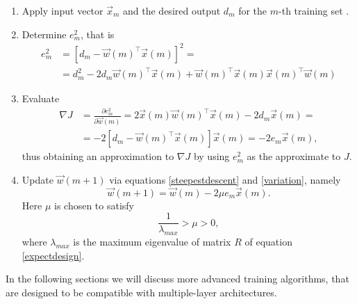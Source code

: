 \documentclass[%
    corpo=11pt,
    twoside,
    stile=classica,
    oldstyle,
    autoretitolo,
    tipotesi=magistrale,
    greek,
    evenboxes,
    english
]{toptesi}
\begin{document}
\begin{enumerate}
\item Apply input vector $\vec{x}_m$ and the desired output $d_m$ for the $m$-th training set .
\item Determine $e_m^2$, that is
\begin{align}
e_m^2  &= \left[d_m - \vec{w}(m)^{\intercal}\vec{x}(m) \right]^2 =  \\ 
& = d_m^2 -2d_m\vec{w}(m)^{\intercal}\vec{x}(m) + \vec{w}(m)^{\intercal}\vec{x}(m)\vec{x}(m)^{\intercal}\vec{w}(m)
\end{align}

\item Evaluate
\begin{align}
\nabla J &= \frac{\partial e_m^2}{\partial \vec{w}(m)} = 2\vec{x}(m)\vec{w}(m)^{\intercal}\vec{x}(m) - 2d_m\vec{x}(m) = \\
		&= -2\left[d_m - \vec{w}(m)^{\intercal}\vec{x}(m) \right]\vec{x}(m) = -2e_m\vec{x}(m),
\end{align}
thus obtaining an approximation to $\nabla J$ by using $e_m^2$ as the approximate to $J$.

\item Update $\vec{w}(m+1)$ via equations \eqref{steepestdescent} and \eqref{variation}, namely
\begin{equation}
\vec{w}(m+1) = \vec{w}(m) -2\mu e_m\vec{x}(m).
\end{equation}
Here $\mu$ is chosen to satisfy 
\begin{equation}
\frac{1}{\lambda_{max}} > \mu > 0,
\end{equation}
where $\lambda_{max}$ is the maximum eigenvalue of matrix $R$ of equation \eqref{expectdesign}.
\end{enumerate}
In the following sections we will discuss more advanced training algorithms, that are designed to be compatible with multiple-layer architectures.
\newpage
\end{document}
